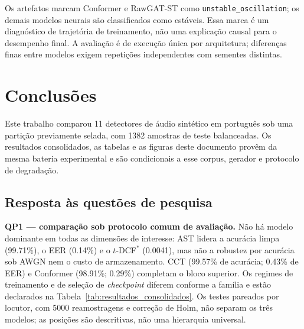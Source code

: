\documentclass[12pt,a4paper]{article}
\begin{document}
Os artefatos marcam Conformer e RawGAT-ST como
\texttt{unstable\_oscillation}; os demais modelos neurais são classificados
como estáveis. Essa marca é um diagnóstico de trajetória de treinamento, não
uma explicação causal para o desempenho final. A avaliação é de execução única por arquitetura; diferenças
finas entre modelos exigem repetições independentes com sementes distintas.

\FloatBarrier

\section{Conclusões}
\label{sec:conclusao}

Este trabalho comparou \num{11} detectores de áudio sintético em português sob
uma partição previamente selada, com \num{1382} amostras de teste balanceadas.
Os resultados consolidados, as tabelas e as figuras deste documento provêm da
mesma bateria experimental e são condicionais a esse corpus, gerador e
protocolo de degradação.

\subsection*{Resposta às questões de pesquisa}

\textbf{QP1 --- comparação sob protocolo comum de avaliação.} Não há modelo
dominante em todas as dimensões de interesse: AST lidera a acurácia limpa
(\num{99,71}\%), o EER (\num{0,14}\%) e o $t$-DCF$^\ast$
(\num{0,0041}), mas não a robustez por acurácia sob AWGN nem o custo de
armazenamento. CCT (\num{99,57}\% de acurácia; \num{0,43}\% de EER) e
Conformer (\num{98,91}\%; \num{0,29}\%) completam o bloco superior. Os
regimes de treinamento e de seleção de \textit{checkpoint} diferem conforme a
família e estão declarados na Tabela~\ref{tab:resultados_consolidados}. Os
testes pareados por locutor, com \num{5000} reamostragens e correção de Holm,
não separam os três modelos; as posições são descritivas, não uma hierarquia
universal.
\end{document}
